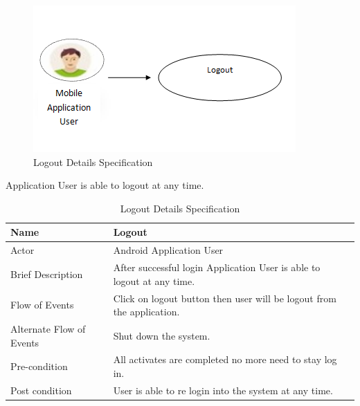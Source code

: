 \newpage
\begin{figure}[H]
  \centering
    \includegraphics{41UseCase}
  \caption{Logout Details Specification}
\end{figure}

Application User is able to logout at any time.
\begin{table}[ht]
\centering

\label{Logout Details Specification}
\begin{tabular}{|l|l|}
\hline
Name                     & Logout                                                                 \\ \hline
Actor                    & Android Application User                                               \\ \hline
Brief Description        & After successful login Application User is able to logout at any time. \\ \hline
Flow of Events           & Click on logout button then user will be logout from the application.  \\ \hline
Alternate Flow of Events & Shut down the system.                                                  \\ \hline
Pre-condition            & All activates are completed no more need to stay log in.               \\ \hline
Post condition           & User is able to re login into the system at any time.                  \\ \hline
\end{tabular}
\caption{Logout Details Specification}
\end{table}

















